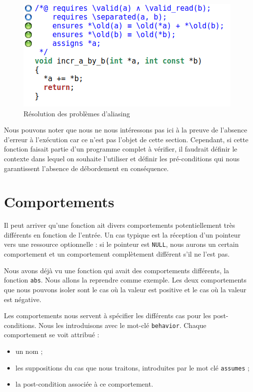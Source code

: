\documentclass[12pt,francais,]{scrbook}
\providecommand{\tightlist}{%
  \setlength{\itemsep}{0pt}\setlength{\parskip}{0pt}}
\begin{document}
\begin{figure}[htbp]
\centering
\includegraphics[scale=0.5]{2-2-2-incr_a_by_b-2.png}
\caption{Résolution des problèmes d'aliasing}
\label{fig:2-2-2-incr_a_by_b-2}
\end{figure}

Nous pouvons noter que nous ne nous intéressons pas ici à la preuve de
l'absence d'erreur à l'exécution car ce n'est pas l'objet de cette
section. Cependant, si cette fonction faisait partie d'un programme
complet à vérifier, il faudrait définir le contexte dans lequel on
souhaite l'utiliser et définir les pré-conditions qui nous garantissent
l'absence de débordement en conséquence.

\section{Comportements}\label{comportements}

Il peut arriver qu'une fonction ait divers comportements potentiellement
très différents en fonction de l'entrée. Un cas typique est la réception
d'un pointeur vers une ressource optionnelle : si le pointeur est
\texttt{NULL}, nous aurons un certain comportement et un comportement
complètement différent s'il ne l'est pas.

Nous avons déjà vu une fonction qui avait des comportements différents,
la fonction \texttt{abs}. Nous allons la reprendre comme exemple. Les
deux comportements que nous pouvons isoler sont le cas où la valeur est
positive et le cas où la valeur est négative.

Les comportements nous servent à spécifier les différents cas pour les
post-conditions. Nous les introduisons avec le mot-clé
\texttt{behavior}. Chaque comportement se voit attribué :

\begin{itemize}
\tightlist
\item
  un nom ;
\item
  les suppositions du cas que nous traitons, introduites par le mot clé
  \texttt{assumes} ;
\item
  la post-condition associée à ce comportement.
\end{itemize}
\end{document}

